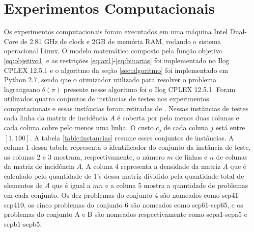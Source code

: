 \section{Experimentos Computacionais}\label{sec:experimentos} 
Os experimentos computacionais foram executados em uma máquina Intel Dual-Core de 2.81 GHz de clock e
2GB de memória RAM, rodando o sistema operacional Linux. O modelo matemático composto pela função objetivo \eqref{eq:objetivo1} e
as restrições \eqref{eq:ax1}-\eqref{eq:binarias} foi implementado
no Ilog CPLEX 12.5.1 e o algoritmo da seção \ref{sec:algoritmo} foi implementado
em Python 2.7, sendo que o otimizador utilizado para resolver o problema lagrangeano $\theta (\pi)$ presente nesse algoritmo foi o Ilog CPLEX 12.5.1.
Foram utilizados quatro conjuntos de instâncias de testes nos experimentos computacionais e essas instâncias foram retiradas de \cite{Beasley90}.
Nessas instâncias de testes cada linha da matriz de incidência $A$ é coberta por pelo menos duas colunas e cada coluna cobre pelo menos uma linha. O
custo $c_j$ de cada coluna $j$ está entre $[1,100]$. A tabela \ref{table:instancias} resume esses conjuntos de instâncias. A coluna 1 dessa tabela 
representa o identificador do conjunto da instância de teste,
as colunas 2 e 3 mostram, respectivamente, o número $m$ de linhas e $n$ de colunas da matriz de incidência $A$. A coluna 4 representa
a densidade da matriz $A$ que é calculado pelo quantidade de 1's dessa matriz dividido pela quantidade total de elementos de $A$ que é igual a 
$mn$ e a coluna 5 mostra a quantidade de problemas em cada conjunto. Os dez problemas do conjunto 4 são nomeados como scp41-scp410, os cinco
problemas do conjunto 6 são nomeados como scp61-scp65, e os problemas do conjunto A e B são nomeados respectivamente como scpa1-scpa5
e scpb1-scpb5.

